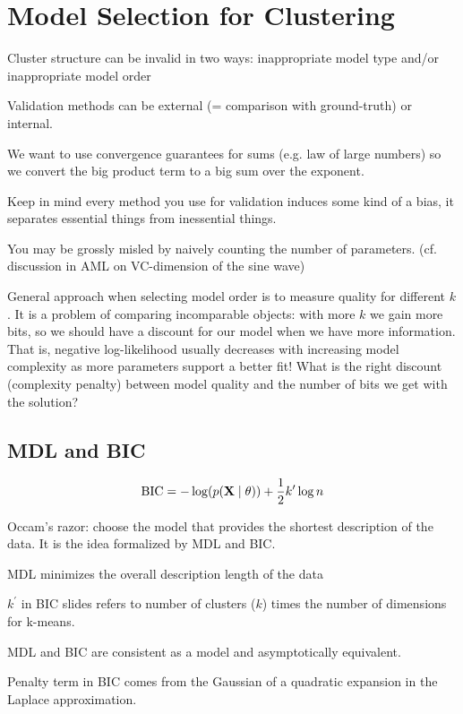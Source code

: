 \documentclass[12pt]{article}
\begin{document}
\section{Model Selection for Clustering}
\ulb
\item Cluster structure can be invalid in two ways: inappropriate model type and/or inappropriate model order
\item Validation methods can be external (= comparison with ground-truth) or internal.
\item We want to use convergence guarantees for sums (e.g. law of large numbers) so we convert the big product term to a big sum over the exponent.
\item Keep in mind every method you use for validation induces some kind of a bias, it separates essential things from inessential things.
\item You may be grossly misled by naively counting the number of parameters. (cf. discussion in AML on VC-dimension of the sine wave)
\ule
\par General approach when selecting model order is to measure quality for different $k$. It is a problem of comparing incomparable objects: with more $k$ we gain more bits, so we should have a discount for our model when we have more information. That is, negative log-likelihood usually decreases with increasing model complexity as more parameters support a better fit! What is the right discount (complexity penalty) between model quality and the number of bits we get with the solution?

\subsection{MDL and BIC}
\[ \text{BIC} = -\log(p(\mathbf{X} \mid \mathbf{\theta})) + \frac{1}{2}k' \log n \]
\ulb
\item Occam's razor: choose the model that provides the shortest description of the data. It is the idea formalized by MDL and BIC.
\item MDL minimizes the overall description length of the data
\item $k^{'}$ in BIC slides refers to number of clusters ($k$) times the number of dimensions for k-means.
\item MDL and BIC are consistent as a model and asymptotically equivalent.
\item Penalty term in BIC comes from the Gaussian of a quadratic expansion in the Laplace approximation.
\ule
\end{document}
